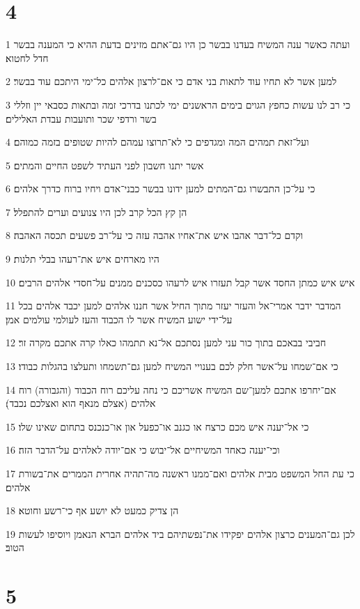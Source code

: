 \chapter{4}

\par 1 ועתה כאשר ענה המשיח בעדנו בבשר כן היו גם־אתם מזינים בדעת ההיא כי המענה בבשר חדל לחטוא׃
\par 2 למען אשר לא תחיו עוד לתאות בני אדם כי אם־לרצון אלהים כל־ימי היתכם עוד בבשר׃
\par 3 כי רב לנו עשות כחפץ הגוים בימים הראשנים ימי לכתנו בדרכי זמה ובתאות כסבאי יין וזללי בשר ורדפי שכר ותועבות עבדת האלילים׃
\par 4 ועל־זאת תמהים המה ומגדפים כי לא־תרוצו עמהם להיות שטופים בזמה כמוהם׃
\par 5 אשר יתנו חשבון לפני העתיד לשפט החיים והמתים׃
\par 6 כי על־כן התבשרו גם־המתים למען ידונו בבשר כבני־אדם ויחיו ברוח כדרך אלהים׃
\par 7 הן קץ הכל קרב לכן היו צנועים וערים להתפלל׃
\par 8 וקדם כל־דבר אהבו איש את־אחיו אהבה עזה כי על־רב פשעים תכסה האהבה׃
\par 9 היו מארחים איש את־רעהו בבלי תלנות׃
\par 10 איש איש כמתן החסד אשר קבל תעזרו איש לרעהו כסכנים ממנים על־חסדי אלהים הרבים׃
\par 11 המדבר ידבר אמרי־אל והעזר יעזר מתוך החיל אשר חננו אלהים למען יכבד אלהים בכל על־ידי ישוע המשיח אשר לו הכבוד והעז לעולמי עולמים אמן׃
\par 12 חביבי בבאכם בתוך כור עני למען נסתכם אל־נא תתמהו כאלו קרה אתכם מקרה זר׃
\par 13 כי אם־שמחו על־אשר חלק לכם בענויי המשיח למען גם־תשמחו ותעלצו בהגלות כבודו׃
\par 14 אם־יחרפו אתכם למען־שם המשיח אשריכם כי נחה עליכם רוח הכבוד (והגבורה) רוח אלהים (אצלם מנאף הוא ואצלכם נכבד)׃
\par 15 כי אל־יענה איש מכם כרצח או כגנב או־כפעל און או־כנכנס בתחום שאינו שלו׃
\par 16 וכי־יענה כאחד המשיחיים אל־יבוש כי אם־יודה לאלהים על־הדבר הזה׃
\par 17 כי עת החל המשפט מבית אלהים ואם־ממנו ראשנה מה־תהיה אחרית הממרים את־בשורת אלהים׃
\par 18 הן צדיק כמעט לא יושע אף כי־רשע וחוטא׃
\par 19 לכן גם־המענים כרצון אלהים יפקידו את־נפשתיהם ביד אלהים הברא הנאמן ויוסיפו לעשות הטוב׃

\chapter{5}

